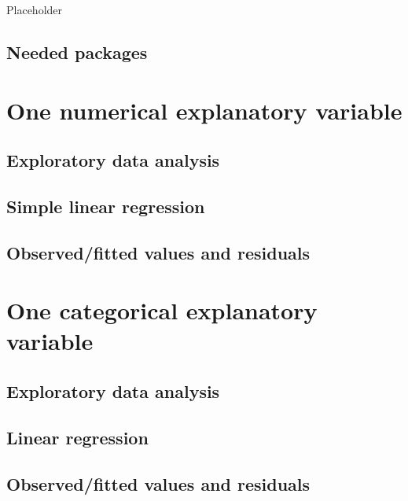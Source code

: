 \documentclass[12pt, krantz2,]{krantz}
\begin{document}
Placeholder

\hypertarget{needed-packages-3}{%
\subsection*{Needed packages}\label{needed-packages-3}}


\hypertarget{model1}{%
\section{One numerical explanatory variable}\label{model1}}

\hypertarget{model1EDA}{%
\subsection{Exploratory data analysis}\label{model1EDA}}

\hypertarget{model1table}{%
\subsection{Simple linear regression}\label{model1table}}

\hypertarget{model1points}{%
\subsection{Observed/fitted values and residuals}\label{model1points}}

\hypertarget{model2}{%
\section{One categorical explanatory variable}\label{model2}}

\hypertarget{model2EDA}{%
\subsection{Exploratory data analysis}\label{model2EDA}}

\hypertarget{model2table}{%
\subsection{Linear regression}\label{model2table}}

\hypertarget{model2points}{%
\subsection{Observed/fitted values and residuals}\label{model2points}}
\end{document}
